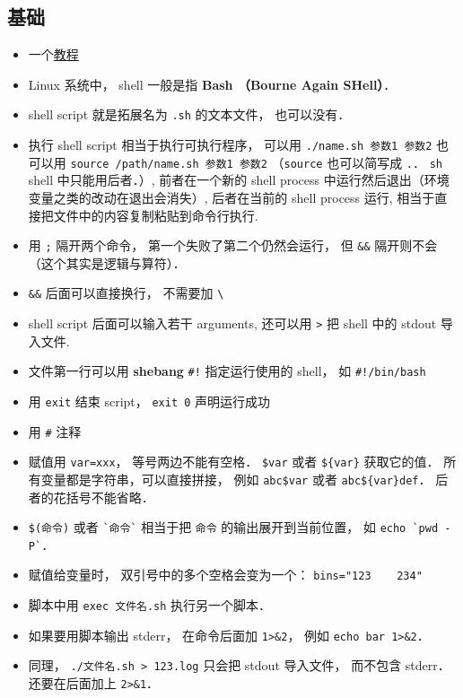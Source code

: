 
\begin{issues}
\issueDraft
\end{issues}


\subsection{基础}
\begin{itemize}
\item 一个\href{https://tldp.org/LDP/abs/html/why-shell.html}{教程}
\item Linux 系统中， shell 一般是指 \textbf{Bash （Bourne Again SHell）}．
\item shell script 就是拓展名为 \verb`.sh` 的文本文件， 也可以没有．
\item 执行 shell script 相当于执行可执行程序， 可以用 \verb`./name.sh 参数1 参数2` 也可以用 \verb`source /path/name.sh 参数1 参数2` （\verb|source| 也可以简写成 \verb|.|． \verb|sh| shell 中只能用后者．）, 前者在一个新的 shell process 中运行然后退出（环境变量之类的改动在退出会消失）, 后者在当前的 shell process 运行, 相当于直接把文件中的内容复制粘贴到命令行执行.
\item 用 \verb|;| 隔开两个命令， 第一个失败了第二个仍然会运行， 但 \verb|&&| 隔开则不会（这个其实是逻辑与算符）．
\item \verb|&&| 后面可以直接换行， 不需要加 \verb|\|
\item shell script 后面可以输入若干 arguments, 还可以用 \verb`>` 把 shell 中的 stdout 导入文件.
\item 文件第一行可以用 \textbf{shebang} \verb`#!` 指定运行使用的 shell， 如 \verb`#!/bin/bash`
\item 用 \verb|exit| 结束 script， \verb`exit 0` 声明运行成功
\item 用 \verb`#` 注释
\item 赋值用 \verb`var=xxx`， 等号两边不能有空格． \verb|$var| 或者 \verb|${var}| 获取它的值． 所有变量都是字符串，可以直接拼接， 例如 \verb|abc$var| 或者 \verb|abc${var}def|． 后者的花括号不能省略．
\item \verb|$(命令)| 或者 \verb|`命令`| 相当于把 \verb|命令| 的输出展开到当前位置， 如 \verb|echo `pwd -P`|．
\item 赋值给变量时， 双引号中的多个空格会变为一个： \verb|bins="123    234"|
\item 脚本中用 \verb|exec 文件名.sh| 执行另一个脚本．
\item 如果要用脚本输出 stderr， 在命令后面加 \verb|1>&2|， 例如 \verb|echo bar 1>&2|．
\item 同理， \verb|./文件名.sh > 123.log| 只会把 stdout 导入文件， 而不包含 stderr． 还要在后面加上 \verb|2>&1|．
\end{itemize}

